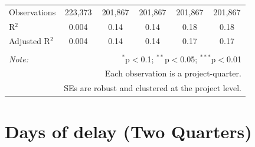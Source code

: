 \documentclass[
]{article}
\begin{document}
\begin{table}[H]
\begin{tabular}{@{\extracolsep{-2pt}}lccccc}
Observations & 223,373 & 201,867 & 201,867 & 201,867 & 201,867 \\ 
R$^{2}$ & 0.004 & 0.14 & 0.14 & 0.18 & 0.18 \\ 
Adjusted R$^{2}$ & 0.004 & 0.14 & 0.14 & 0.17 & 0.17 \\ 
\hline 
\hline \\[-1.8ex] 
\textit{Note:}  & \multicolumn{5}{r}{$^{*}$p$<$0.1; $^{**}$p$<$0.05; $^{***}$p$<$0.01} \\ 
 & \multicolumn{5}{r}{Each observation is a project-quarter.} \\ 
 & \multicolumn{5}{r}{SEs are robust and clustered at the project level.} \\ 
\end{tabular} 
\end{table}

\hypertarget{days-of-delay-two-quarters}{%
\section{Days of delay (Two
Quarters)}\label{days-of-delay-two-quarters}}
\end{document}
